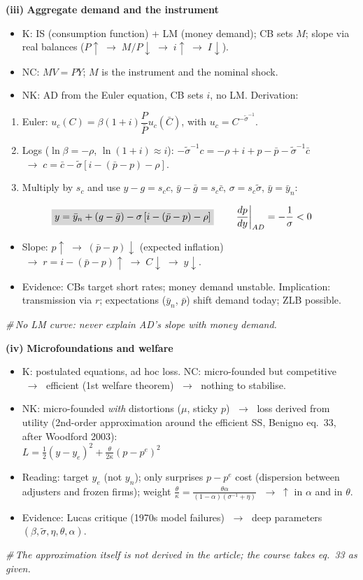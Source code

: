 \documentclass[11pt, a4paper]{article}
\newcommand{\res}[1]{\colorbox{hl}{$\displaystyle #1$}}
\newcommand{\nota}[1]{\par\hfill\textcolor{margem}{\small\itshape\#\,#1}\par}
\newcommand{\itm}[1]{\par\smallskip\needspace{3\baselineskip}\noindent\textbf{(#1)}\quad}
\newcommand{\ra}{\;\rightarrow\;}
\newcommand{\Sg}{\left(\sigma^{-1}+\eta\right)}
\begin{document}
\itm{iii} \textbf{Aggregate demand and the instrument}
\begin{itemize}
\item K: IS (consumption function) + LM (money demand); CB sets $M$; slope via real balances
      ($P\uparrow\ra M/P\downarrow\ra i\uparrow\ra I\downarrow$).
\item NC: $MV=PY$; $M$ is the instrument and the nominal shock.
\item NK: AD from the Euler equation, CB sets $i$, no LM. Derivation:
\end{itemize}
\begin{enumerate}[label=\arabic*., leftmargin=2.2em]
\item Euler: $u_c(C)=\beta(1+i)\dfrac{P}{\bar P}u_c(\bar C)$, with $u_c=C^{-\tilde\sigma^{-1}}$.
\item Logs ($\ln\beta=-\rho$, $\ln(1+i)\approx i$):
      $-\tilde\sigma^{-1}c=-\rho+i+p-\bar p-\tilde\sigma^{-1}\bar c$
      $\ra c=\bar c-\tilde\sigma\left[i-(\bar p-p)-\rho\right]$.
\item Multiply by $s_c$ and use $y-g=s_c c$, $\bar y-\bar g=s_c\bar c$, $\sigma=s_c\tilde\sigma$,
      $\bar y=\bar y_n$:
\end{enumerate}
\[
\res{y=\bar y_n+(g-\bar g)-\sigma\left[i-(\bar p-p)-\rho\right]}\qquad
\left.\frac{dp}{dy}\right|_{AD}=-\frac1\sigma<0
\]
\begin{itemize}
\item Slope: $p\uparrow\ra(\bar p-p)\downarrow$ (expected inflation) $\ra r=i-(\bar p-p)\uparrow
      \ra C\downarrow\ra y\downarrow$.
\item Evidence: CBs target short rates; money demand unstable. Implication: transmission via
      $r$; expectations ($\bar y_n$, $\bar p$) shift demand today; ZLB possible.
\end{itemize}
\nota{No LM curve: never explain AD's slope with money demand.}

\itm{iv} \textbf{Microfoundations and welfare}
\begin{itemize}
\item K: postulated equations, ad hoc loss. NC: micro-founded but competitive $\ra$ efficient
      (1st welfare theorem) $\ra$ nothing to stabilise.
\item NK: micro-founded \emph{with} distortions ($\mu$, sticky $p$) $\ra$ loss derived from
      utility (2nd-order approximation around the efficient SS, Benigno eq.~33, after
      Woodford 2003):\\[2pt]
      \res{L=\tfrac12(y-y_e)^2+\tfrac{\theta}{2\kappa}(p-p^e)^2}
\item Reading: target $y_e$ (not $y_n$); only surprises $p-p^e$ cost (dispersion between
      adjusters and frozen firms); weight $\tfrac\theta\kappa=\tfrac{\theta\alpha}{(1-\alpha)\Sg}$
      $\ra\uparrow$ in $\alpha$ and in $\theta$.
\item Evidence: Lucas critique (1970s model failures) $\ra$ deep parameters
      $(\beta,\tilde\sigma,\eta,\theta,\alpha)$.
\end{itemize}
\nota{The approximation itself is not derived in the article; the course takes eq.~33 as given.}
\end{document}
